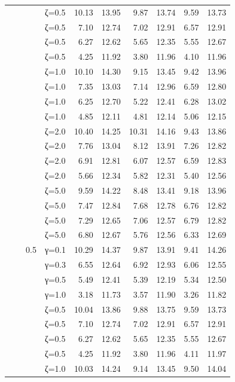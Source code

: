 \begin{table}[htbp]
\begin{tabular}{ll r l  rr  rr  rr}
  &  &  & ζ=0.5 & 10.13 & 13.95 & 9.87 & 13.74 & 9.59 & 13.73 \\
  &  &  & ζ=0.5 & 7.10 & 12.74 & 7.02 & 12.91 & 6.57 & 12.91 \\
  &  &  & ζ=0.5 & 6.27 & 12.62 & 5.65 & 12.35 & 5.55 & 12.67 \\
  &  &  & ζ=0.5 & 4.25 & 11.92 & 3.80 & 11.96 & 4.10 & 11.96 \\
  &  &  & ζ=1.0 & 10.10 & 14.30 & 9.15 & 13.45 & 9.42 & 13.96 \\
  &  &  & ζ=1.0 & 7.35 & 13.03 & 7.14 & 12.96 & 6.59 & 12.80 \\
  &  &  & ζ=1.0 & 6.25 & 12.70 & 5.22 & 12.41 & 6.28 & 13.02 \\
  &  &  & ζ=1.0 & 4.85 & 12.11 & 4.81 & 12.14 & 5.06 & 12.15 \\
  &  &  & ζ=2.0 & 10.40 & 14.25 & 10.31 & 14.16 & 9.43 & 13.86 \\
  &  &  & ζ=2.0 & 7.76 & 13.04 & 8.12 & 13.91 & 7.26 & 12.82 \\
  &  &  & ζ=2.0 & 6.91 & 12.81 & 6.07 & 12.57 & 6.59 & 12.83 \\
  &  &  & ζ=2.0 & 5.66 & 12.34 & 5.82 & 12.31 & 5.40 & 12.56 \\
  &  &  & ζ=5.0 & 9.59 & 14.22 & 8.48 & 13.41 & 9.18 & 13.96 \\
  &  &  & ζ=5.0 & 7.47 & 12.84 & 7.68 & 12.78 & 6.76 & 12.82 \\
  &  &  & ζ=5.0 & 7.29 & 12.65 & 7.06 & 12.57 & 6.79 & 12.82 \\
  &  &  & ζ=5.0 & 6.80 & 12.67 & 5.76 & 12.56 & 6.33 & 12.69 \\
  &  & 0.5 & γ=0.1 & 10.29 & 14.37 & 9.87 & 13.91 & 9.41 & 14.26 \\
  &  &  & γ=0.3 & 6.55 & 12.64 & 6.92 & 12.93 & 6.06 & 12.55 \\
  &  &  & γ=0.5 & 5.49 & 12.41 & 5.39 & 12.19 & 5.34 & 12.50 \\
  &  &  & γ=1.0 & 3.18 & 11.73 & 3.57 & 11.90 & 3.26 & 11.82 \\
  &  &  & ζ=0.5 & 10.04 & 13.86 & 9.88 & 13.75 & 9.59 & 13.73 \\
  &  &  & ζ=0.5 & 7.10 & 12.74 & 7.02 & 12.91 & 6.57 & 12.91 \\
  &  &  & ζ=0.5 & 6.27 & 12.62 & 5.65 & 12.35 & 5.55 & 12.67 \\
  &  &  & ζ=0.5 & 4.25 & 11.92 & 3.80 & 11.96 & 4.11 & 11.97 \\
  &  &  & ζ=1.0 & 10.03 & 14.24 & 9.14 & 13.45 & 9.50 & 14.04 \\

\end{tabular}
\end{table}
